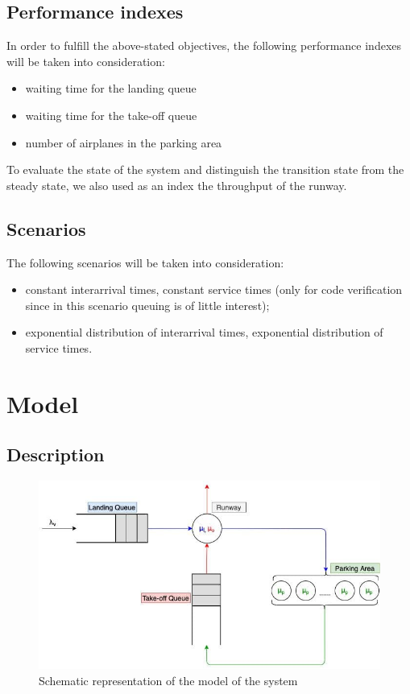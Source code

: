 \documentclass[12pt]{article}
\begin{document}
\subsection{Performance indexes}
In order to fulfill the above-stated objectives, the following performance indexes will be taken into consideration:
\begin{itemize}
	\item waiting time for the landing queue
	\item waiting time for the take-off queue
	\item number of airplanes in the parking area
\end{itemize}
To evaluate the state of the system and distinguish the transition state from the steady state, we also used as an index the throughput of the runway.

\subsection{Scenarios}
The following scenarios will be taken into consideration:
\begin{itemize}
	\item constant interarrival times, constant service times (only for code verification since in this scenario queuing is of little interest);
	\item exponential distribution of interarrival times, exponential distribution of service times.
\end{itemize}

\section{Model}
\subsection{Description}

\begin{figure}[ht!]
    \centering
    \includegraphics[scale=0.8]{immagini/system_model.jpg}
    \caption{Schematic representation of the model of the system}
    \label{Fig:model}
\end{figure}
\end{document}
